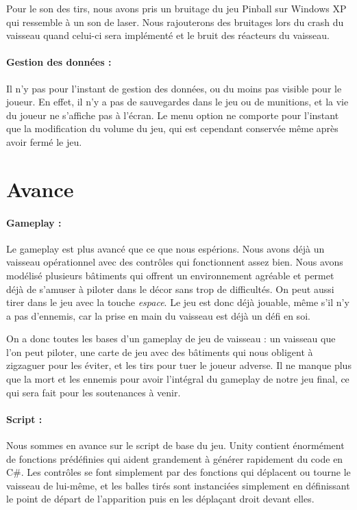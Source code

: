 \documentclass[10pt, titlepage]{report}
\begin{document}
 Pour le son des tirs, nous avons pris un bruitage du jeu Pinball sur Windows XP qui ressemble à un son de laser. Nous rajouterons des bruitages lors du crash du vaisseau quand celui-ci sera implémenté et le bruit des réacteurs du vaisseau.

\paragraph{Gestion des données :}
Il n'y pas pour l'instant de gestion des données, ou du moins pas visible pour le joueur. En effet, il n'y a pas de sauvegardes dans le jeu ou de munitions, et la vie du joueur ne s'affiche pas à l'écran. Le menu option ne comporte pour l'instant que la modification du volume du jeu, qui est cependant conservée même après avoir fermé le jeu.

\section{Avance}

\paragraph{Gameplay :}
Le gameplay est plus avancé que ce que nous espérions. Nous avons déjà un vaisseau opérationnel avec des contrôles qui fonctionnent assez bien. Nous avons modélisé plusieurs bâtiments qui offrent un environnement agréable et permet déjà de s'amuser à piloter dans le décor sans trop de difficultés. On peut aussi tirer dans le jeu avec la touche \textit{espace}. Le jeu est donc déjà jouable, même s'il n'y a pas d'ennemis, car la prise en main du vaisseau est déjà un défi en soi.

On a donc toutes les bases d'un gameplay de jeu de vaisseau : un vaisseau que l'on peut piloter, une carte de jeu avec des bâtiments qui nous obligent à zigzaguer pour les éviter, et les tirs pour tuer le joueur adverse. Il ne manque plus que la mort et les ennemis pour avoir l'intégral du gameplay de notre jeu final, ce qui sera fait pour les soutenances à venir.

\paragraph{Script :}
Nous sommes en avance sur le script de base du jeu. Unity contient énormément de fonctions prédéfinies qui aident grandement à générer rapidement du code en C\#. Les contrôles se font simplement par des fonctions qui déplacent ou tourne le vaisseau de lui-même, et les balles tirés sont instanciées simplement en définissant le point de départ de l'apparition puis en les déplaçant droit devant elles.
\end{document}
